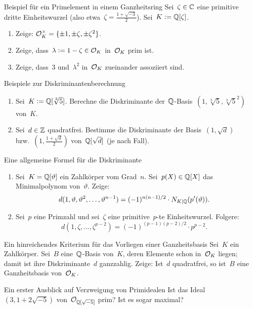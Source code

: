 \documentclass{uebblatt}
\begin{document}

\begin{aufgabe}{Beispiel für ein Primelement in einem Ganzheitsring}
Sei~$\zeta \in \mathbb{C}$ eine primitive dritte Einheitswurzel (also etwa~$\zeta =
\frac{1+\sqrt{-3}}{2}$). Sei~$K \vcentcolon= \mathbb{Q}[\zeta]$.
\begin{enumerate}
\item Zeige: $\mathcal{O}_K^\times = \{ \pm 1, \pm \zeta, \pm \zeta^2 \}$.
\item Zeige, dass~$\lambda \vcentcolon= 1 - \zeta \in \mathcal{O}_K$ in~$\mathcal{O}_K$ prim ist.
\item Zeige, dass~$3$ und~$\lambda^2$ in~$\mathcal{O}_K$ zueinander assoziiert sind.
\end{enumerate}
\end{aufgabe}

\begin{aufgabe}{Beispiele zur Diskriminantenberechnung}
\begin{enumerate}
\item Sei~$K \vcentcolon= \mathbb{Q}[\sqrt[3]{5}]$. Berechne die Diskriminante
der~$\mathbb{Q}$-Basis~$(1,\sqrt[3]{5},\sqrt[3]{5}^2)$ von~$K$.
\item Sei~$d \in \mathbb{Z}$ quadratfrei. Bestimme die Diskriminante der
Basis~$(1,\sqrt{d})$ bzw.~$(1,\frac{1+\sqrt{d}}{2})$ von~$\mathbb{Q}[\sqrt{d}]$ (je
nach Fall).
\end{enumerate}
\end{aufgabe}

\begin{aufgabe}{Eine allgemeine Formel für die Diskriminante}
\begin{enumerate}
\item Sei~$K = \mathbb{Q}[\vartheta]$ ein Zahlkörper vom Grad~$n$. Sei~$p(X) \in \mathbb{Q}[X]$ das
Minimalpolynom von~$\vartheta$. Zeige:
\[ d(1,\vartheta,\vartheta^2,\ldots,\vartheta^{n-1}) =
  (-1)^{n(n-1)/2} \cdot N_{K|\mathbb{Q}}(p'(\vartheta)). \]
\item Sei~$p$ eine Primzahl und sei~$\zeta$ eine primitive~$p$-te
Einheitswurzel. Folgere:
\[ d(1,\zeta,\ldots,\zeta^{p-2}) =
  (-1)^{(p-1)(p-2)/2} \cdot p^{p-2}. \]
\end{enumerate}
\vspace*{-1em}
\end{aufgabe}

\begin{aufgabe}{Ein hinreichendes Kriterium für das Vorliegen einer Ganzheitsbasis}
Sei~$K$ ein Zahlkörper. Sei~$B$ eine~$\mathbb{Q}$-Basis von~$K$, deren Elemente schon
in~$\mathcal{O}_K$ liegen; damit ist ihre Diskriminante~$d$ ganzzahlig. Zeige: Ist~$d$
quadratfrei, so ist~$B$ eine Ganzheitsbasis von~$\mathcal{O}_K$.
\end{aufgabe}

\begin{aufgabe}{Ein erster Ausblick auf Verzweigung von Primidealen}
Ist das Ideal~$(3, 1+2\sqrt{-5})$ von~$\mathcal{O}_{\mathbb{Q}[\sqrt{-5}]}$ prim? Ist es sogar
maximal?
\end{aufgabe}
\end{document}
